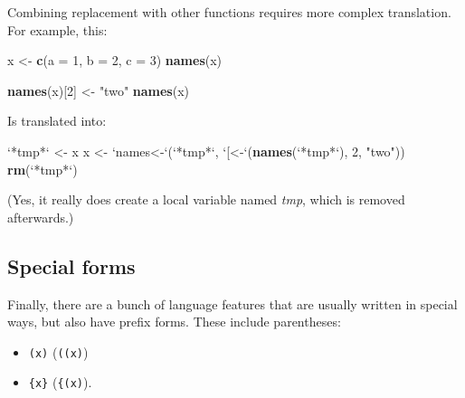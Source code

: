 \documentclass[]{book}
\newenvironment{Shaded}{\begin{snugshade}}{\end{snugshade}}
\newcommand{\DataTypeTok}[1]{\textcolor[rgb]{0.13,0.29,0.53}{#1}}
\newcommand{\DecValTok}[1]{\textcolor[rgb]{0.00,0.00,0.81}{#1}}
\newcommand{\KeywordTok}[1]{\textcolor[rgb]{0.13,0.29,0.53}{\textbf{#1}}}
\newcommand{\NormalTok}[1]{#1}
\newcommand{\StringTok}[1]{\textcolor[rgb]{0.31,0.60,0.02}{#1}}
\providecommand{\tightlist}{%
  \setlength{\itemsep}{0pt}\setlength{\parskip}{0pt}}
\theoremstyle{definition}
\theoremstyle{definition}
\theoremstyle{definition}
\theoremstyle{remark}
\begin{document}
Combining replacement with other functions requires more complex
translation. For example, this:

\begin{Shaded}
\begin{Highlighting}[]
\NormalTok{x <-}\StringTok{ }\KeywordTok{c}\NormalTok{(}\DataTypeTok{a =} \DecValTok{1}\NormalTok{, }\DataTypeTok{b =} \DecValTok{2}\NormalTok{, }\DataTypeTok{c =} \DecValTok{3}\NormalTok{)}
\KeywordTok{names}\NormalTok{(x)}
\end{Highlighting}
\end{Shaded}

\begin{Shaded}
\begin{Highlighting}[]
\KeywordTok{names}\NormalTok{(x)[}\DecValTok{2}\NormalTok{] <-}\StringTok{ "two"}
\KeywordTok{names}\NormalTok{(x)}
\end{Highlighting}
\end{Shaded}

Is translated into:

\begin{Shaded}
\begin{Highlighting}[]
\StringTok{`}\DataTypeTok{*tmp*}\StringTok{`}\NormalTok{ <-}\StringTok{ }\NormalTok{x}
\NormalTok{x <-}\StringTok{ `}\DataTypeTok{names<-}\StringTok{`}\NormalTok{(}\StringTok{`}\DataTypeTok{*tmp*}\StringTok{`}\NormalTok{, }\StringTok{`}\DataTypeTok{[<-}\StringTok{`}\NormalTok{(}\KeywordTok{names}\NormalTok{(}\StringTok{`}\DataTypeTok{*tmp*}\StringTok{`}\NormalTok{), }\DecValTok{2}\NormalTok{, }\StringTok{"two"}\NormalTok{))}
\KeywordTok{rm}\NormalTok{(}\StringTok{`}\DataTypeTok{*tmp*}\StringTok{`}\NormalTok{)}
\end{Highlighting}
\end{Shaded}

(Yes, it really does create a local variable named \emph{tmp}, which is
removed afterwards.)

\hypertarget{special-forms}{%
\subsection{Special forms}\label{special-forms}}

Finally, there are a bunch of language features that are usually written
in special ways, but also have prefix forms. These include parentheses:

\begin{itemize}
\tightlist
\item
  \texttt{(x)} (\texttt{\textasciigrave{}(\textasciigrave{}(x)})
\item
  \texttt{\{x\}} (\texttt{\textasciigrave{}\{\textasciigrave{}(x)}).
\end{itemize}
\end{document}
